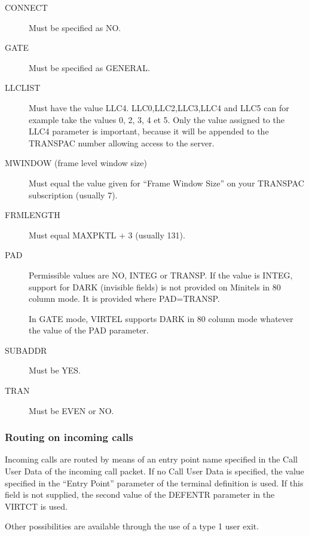 \documentclass[letterpaper,10pt,english]{sphinxmanual}
\begin{document}
\begin{description}
\item[{CONNECT}] \leavevmode
Must be specified as NO.

\item[{GATE}] \leavevmode
Must be specified as GENERAL.

\item[{LLCLIST}] \leavevmode
Must have the value LLC4. LLC0,LLC2,LLC3,LLC4 and LLC5 can for example take the values 0, 2, 3, 4 et 5. Only the value assigned to the LLC4 parameter is important, because it will be appended to the TRANSPAC number allowing access to the server.

\item[{MWINDOW (frame level window size)}] \leavevmode
Must equal the value given for “Frame Window Size” on your TRANSPAC subscription (usually 7).

\item[{FRMLENGTH}] \leavevmode
Must equal MAXPKTL + 3 (usually 131).

\item[{PAD}] \leavevmode
Permissible values are NO, INTEG or TRANSP. If the value is INTEG, support for DARK (invisible fields) is not provided on Minitels in
80 column mode. It is provided where PAD=TRANSP.

In GATE mode, VIRTEL supports DARK in 80 column mode whatever the value of the PAD parameter.

\item[{SUBADDR}] \leavevmode
Must be YES.

\item[{TRAN}] \leavevmode
Must be EVEN or NO.

\end{description}


\subsubsection{Routing on incoming calls}
\label{\detokenize{connectivity_guide:routing-on-incoming-calls}}
Incoming calls are routed by means of an entry point name specified in the Call User Data of the incoming call packet. If no Call User Data is specified, the value specified in the “Entry Point” parameter of the terminal definition is used. If this field is not supplied, the second value of the DEFENTR parameter in the VIRTCT is used.

Other possibilities are available through the use of a type 1 user exit.
\end{document}
